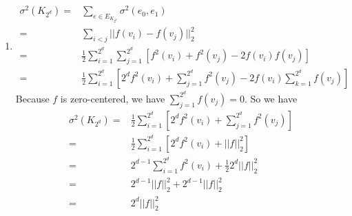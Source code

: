 \documentclass[twoside,11pt]{homework}
\begin{document}
\begin{enumerate}
    \item
    \begin{align*}
        \sigma^2(K_{2^d}) = & \sum_{e \in E_{K_{2^d}}}\sigma^2(e_0,e_1)\\
        =& \sum_{i<j} ||f(v_i)-f(v_j)||_2^2\\
        =& \frac{1}{2}\sum_{i=1}^{2^d}\sum_{j=1}^{2^d}[f^2(v_i)+f^2(v_j)-2f(v_i)f(v_j)] \\
        =&\frac{1}{2} \sum_{i=1}^{2^d}[2^d f^2(v_i) + \sum_{j=1}^{2^d}f^2(v_j) - 2f(v_i)\sum_{k=1}^{2^d}f(v_j)]
    \end{align*}
    Because $f$ is zero-centered, we have $\sum_{j=1}^{2^d}f(v_j)=0$. So we have
    \begin{align*}
        \sigma^2(K_{2^d}) = &\frac{1}{2} \sum_{i=1}^{2^d}[2^d f^2(v_i) + \sum_{j=1}^{2^d}f^2(v_j) ]\\
        =&  \frac{1}{2} \sum_{i=1}^{2^d}[2^df^2(v_i) + ||f||_2^2]\\
        =& 2^{d-1}\sum_{i=1}^{2^d}f^2(v_i) + \frac{1}{2} 2^d||f||_2^2\\
        =& 2^{d-1}||f||_2^2 + 2^{d-1}||f||_2^2\\
        =& 2^d ||f||_2^2
    \end{align*}
    

\end{enumerate}
\end{document}
